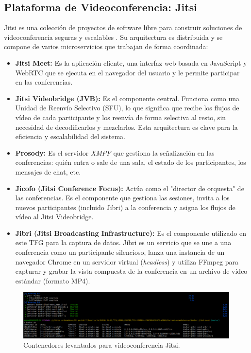 \subsection{Plataforma de Videoconferencia: Jitsi}
Jitsi es una colección de proyectos de software libre para construir soluciones de videoconferencia seguras y escalables \cite{JitsiJibriDocs}. Su arquitectura es distribuida y se compone de varios microservicios que trabajan de forma coordinada:
\begin{itemize}
    \item \textbf{Jitsi Meet:} Es la aplicación cliente, una interfaz web basada en JavaScript y WebRTC que se ejecuta en el navegador del usuario y le permite participar en las conferencias.
    \item \textbf{Jitsi Videobridge (JVB):} Es el componente central. Funciona como una Unidad de Reenvío Selectivo (SFU), lo que significa que recibe los flujos de vídeo de cada participante y los reenvía de forma selectiva al resto, sin necesidad de decodificarlos y mezclarlos. Esta arquitectura es clave para la eficiencia y escalabilidad del sistema.
    \item \textbf{Prosody:} Es el servidor \textit{XMPP} que gestiona la señalización en las conferencias: quién entra o sale de una sala, el estado de los participantes, los mensajes de chat, etc.
    \item \textbf{Jicofo (Jitsi Conference Focus):} Actúa como el "director de orquesta" de las conferencias. Es el componente que gestiona las sesiones, invita a los nuevos participantes (incluido Jibri) a la conferencia y asigna los flujos de vídeo al Jitsi Videobridge.
    \item \textbf{Jibri (Jitsi Broadcasting Infrastructure):} Es el componente utilizado en este TFG para la captura de datos. Jibri es un servicio que se une a una conferencia como un participante silencioso, lanza una instancia de un navegador Chrome en un servidor virtual (\textit{headless}) y utiliza FFmpeg para capturar y grabar la vista compuesta de la conferencia en un archivo de vídeo estándar (formato MP4).
\end{itemize}

\begin{figure}[H]
    \centering
    \includegraphics[width=\textwidth]{img/jitsimeet.png}
    \caption{Contenedores levantados para videoconferencia Jitsi.}
    \label{fig:Jitsi meet contenedores}
\end{figure}

